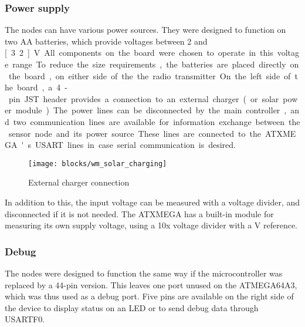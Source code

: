 \subsubsection{Power supply}
\label{sub2:hardware-powersupply}

The nodes can have various power sources. They were designed to function on two
AA batteries, which provide voltages between 2 and \unit[3.2]{V}. All components on
the board were chosen to operate in this voltage range.

To reduce the size requirements, the batteries are placed directly on the board,
on either side of the the radio transmitter.

On the left side of the board, a 4-pin JST header provides a connection to an
external charger (or solar power module). The power lines can be disconnected by
the main controller, and two communication lines are available for information
exchange between the sensor node and its power source. These lines are connected
to the ATXMEGA's USART lines in case serial communication is desired.

\begin{figure}[h]
  \begin{center}
    \texttt{[image: blocks/wm\_solar\_charging]}
  \end{center}
  \caption{External charger connection}
  \label{fig:solar-charger}
\end{figure}

In addition to this, the input voltage can be measured with a voltage divider,
and disconnected if it is not needed. The ATXMEGA has a built-in module for
measuring its own supply voltage, using a 10x voltage divider with a \unit[1]{V}
reference.

\subsubsection{Debug}

The nodes were designed to function the same way if the microcontroller was
replaced by a 44-pin version. This leaves one port unused on the ATMEGA64A3,
which was thus used as a debug port. Five pins are available on the right side
of the device to display status on an LED or to send debug data through USARTF0.

